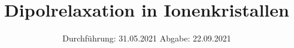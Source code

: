

\subject{V 48}
\title{Dipolrelaxation in Ionenkristallen}
\date{%
  Durchführung: 31.05.2021
  \hspace{3em}
  Abgabe: 22.09.2021
}



\maketitle
\thispagestyle{empty}
\tableofcontents
\newpage







\printbibliography{}


